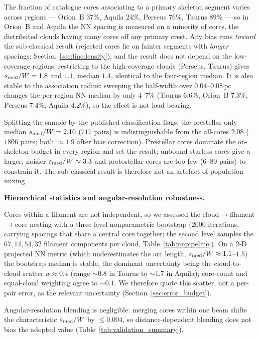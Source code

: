 \documentclass[usenatbib,twoside,twocolumn]{mnras}
\begin{document}
The fraction of catalogue cores associating to a primary skeleton segment varies across regions --- Orion~B $37\%$, Aquila $24\%$, Perseus $76\%$, Taurus $89\%$ --- so in Orion~B and Aquila the NN spacing is measured on a minority of cores, the distributed clouds having many cores off any primary crest. Any bias runs \emph{toward} the sub-classical result (rejected cores lie on fainter segments with \emph{longer} spacings; Section~\ref{sec:linedensity}), and the result does not depend on the low-coverage regions: restricting to the high-coverage clouds (Perseus, Taurus) gives $s_{\rm med}/W=1.8$ and $1.1$, median $1.4$, identical to the four-region median. It is also stable to the association radius: sweeping the half-width over $0.04$--$0.08$\,pc changes the per-region NN median by only $4$--$7\%$ (Taurus $6.6\%$, Orion~B $7.3\%$, Perseus $7.4\%$, Aquila $4.2\%$), so the effect is not load-bearing.

Splitting the sample by the published classification flags, the prestellar-only median $s_{\rm med}/W=2.10$ ($717$ pairs) is indistinguishable from the all-cores $2.08$ ($1806$ pairs; both $\approx1.9$ after bias correction). Prestellar cores dominate the on-skeleton budget in every region and set the result; unbound starless cores give a larger, noisier $s_{\rm med}/W\approx3.3$ and protostellar cores are too few ($6$--$80$ pairs) to constrain it. The sub-classical result is therefore not an artefact of population mixing.

\smallskip\noindent\textbf{Hierarchical statistics and angular-resolution robustness.}

Cores within a filament are not independent, so we assessed the cloud$\to$filament$\to$core nesting with a three-level nonparametric bootstrap (2000 iterations, carrying spacings that share a central core together; the second level samples the $67,14,54,32$ filament components per cloud, Table~\ref{tab:nnpipeline}). On a 2-D projected NN metric (which underestimates the arc length, $s_{\rm med}/W\approx1.1$--$1.5$) the bootstrap median is stable, the dominant uncertainty being the cloud-to-cloud scatter $\sigma\approx0.4$ (range $\sim0.8$ in Taurus to $\sim1.7$ in Aquila); core-count and equal-cloud weighting agree to $\sim0.1$. We therefore quote this scatter, not a per-pair error, as the relevant uncertainty (Section~\ref{sec:error_budget}).

Angular-resolution blending is negligible: merging cores within one beam shifts the characteristic $s_{\rm med}/W$ by $\le0.004$, so distance-dependent blending does not bias the adopted value (Table~\ref{tab:validation_summary}).
\end{document}
